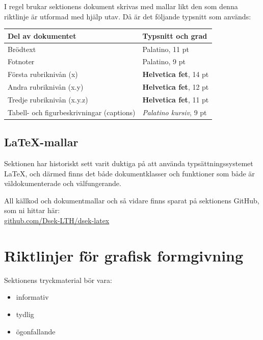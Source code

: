 \documentclass[]{dsekprotokoll}
\begin{document}
I regel brukar sektionens dokument skrivas med mallar likt den som denna riktlinje är utformad med hjälp utav. Då är det följande typsnitt som används:

\begin{table}[!hbp]
    \centering
    \begin{tabular}{ll}
        \toprule
        \textbf{Del av dokumentet}                & \textbf{Typsnitt och grad}                 \\
        \midrule
        Brödtext                                  & Palatino, 11 pt                            \\
        Fotnoter                                  & Palatino, 9 pt                             \\
        Första rubriknivån (x)                    & {\sffamily \bfseries Helvetica fet}, 14 pt \\
        Andra rubriknivån (x.y)                   & {\sffamily \bfseries Helvetica fet}, 12 pt \\
        Tredje rubriknivån (x.y.z)                & {\sffamily \bfseries Helvetica fet}, 11 pt \\
        Tabell- och figurbeskrivningar (captions) & \textit{Palatino kursiv}, 9 pt             \\

        \bottomrule
    \end{tabular}
    \label{tab:my_label}
\end{table}

\subsection{\LaTeX-mallar}
Sektionen har historiskt sett varit duktiga på att använda typsättningssystemet \LaTeX, och därmed finns det både dokumentklasser och funktioner som både är väldokumenterade och välfungerande.

All källkod och dokumentmallar och så vidare finns sparat på sektionens GitHub, som ni hittar här: \\
\href{https://github.com/Dsek-LTH/dsek-latex}{github.com/Dsek-LTH/dsek-latex}

\section{Riktlinjer för grafisk formgivning}
Sektionens tryckmaterial bör vara:
\begin{itemize}
    \item informativ
    \item tydlig
    \item ögonfallande
\end{itemize}
\end{document}
